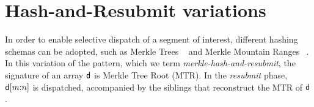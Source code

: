 \section{Hash-and-Resubmit variations}
\label{sec:hash-appendix}
In order to enable selective dispatch of a segment of interest, different
hashing schemas can be adopted, such as Merkle Trees ~\cite{merkle} and Merkle Mountain
Ranges ~\cite{mmr-1,mmr-2}. In this variation of the pattern, which we term
\emph{merkle-hash-and-resubmit}, the signature of an array $\mathsf{d}$ is
Merkle Tree Root (MTR). In the \emph{resubmit} phase, $\mathsf{d}[m{:}n]$ is
dispatched, accompanied by the siblings that reconstruct the MTR of
$\mathsf{d}$.

